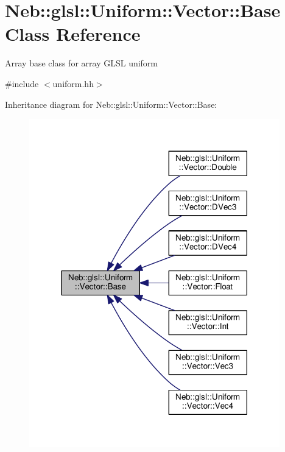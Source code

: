 \hypertarget{classNeb_1_1glsl_1_1Uniform_1_1Vector_1_1Base}{\section{Neb\-:\-:glsl\-:\-:Uniform\-:\-:Vector\-:\-:Base Class Reference}
\label{classNeb_1_1glsl_1_1Uniform_1_1Vector_1_1Base}
}


Array base class for array G\-L\-S\-L uniform  




{\ttfamily \#include $<$uniform.\-hh$>$}



Inheritance diagram for Neb\-:\-:glsl\-:\-:Uniform\-:\-:Vector\-:\-:Base\-:
\nopagebreak
\begin{figure}[H]
\begin{center}
\leavevmode
\includegraphics[width=308pt]{classNeb_1_1glsl_1_1Uniform_1_1Vector_1_1Base__inherit__graph}
\end{center}
\end{figure}
